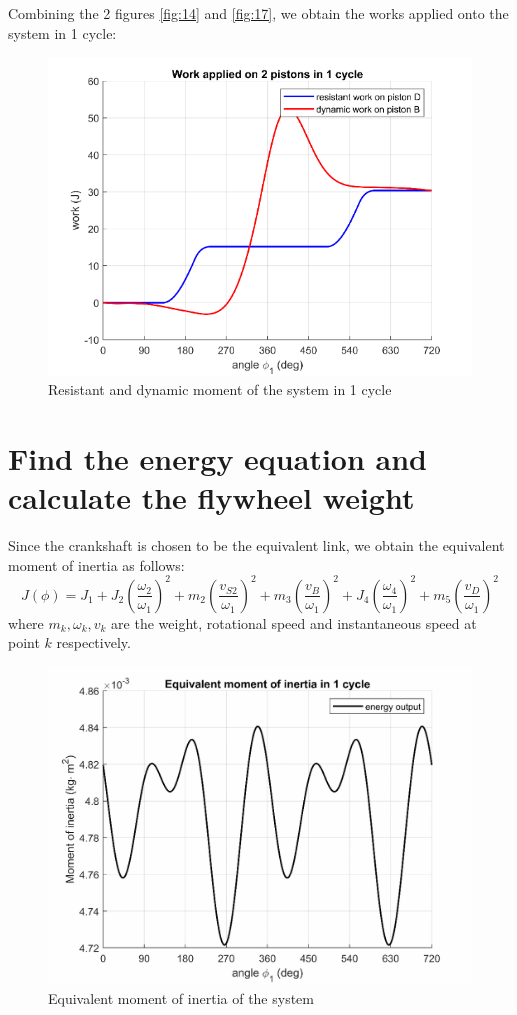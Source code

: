 Combining the 2 figures \ref{fig:14} and \ref{fig:17}, we obtain the works applied onto the system in 1 cycle:
\begin{figure}
	\centering
	\includegraphics[width=0.6\linewidth]{18}
	\caption{Resistant and dynamic moment of the system in 1 cycle}
	\label{fig:18}
\end{figure}
\section{Find the energy equation and calculate the flywheel weight}
Since the crankshaft is chosen to be the equivalent link, we obtain the equivalent moment of inertia as follows:
\begin{equation}
	J(\phi)=J_1+J_2\left(\dfrac{\omega_2}{\omega_1}\right)^2+m_2\left(\dfrac{v_{S2}}{\omega_1}\right)^2+m_3\left(\dfrac{v_{B}}{\omega_1}\right)^2+J_4\left(\dfrac{\omega_4}{\omega_1}\right)^2+m_5\left(\dfrac{v_{D}}{\omega_1}\right)^2
\end{equation}
where $ m_k,\omega_k,v_k $ are the weight, rotational speed and instantaneous speed at point $ k $ respectively.
\begin{figure}[ht]
	\centering
	\includegraphics[width=0.6\linewidth]{19}
	\caption{Equivalent moment of inertia of the system}
	\label{fig:19}
\end{figure}

